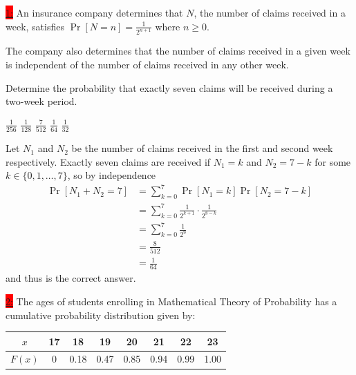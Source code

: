\documentclass{exam}
\begin{document}
\colorbox{red}{\underline{1:}} An insurance company determines that $N$, the number of claims received in a week, satisfies $\Pr[N = n] = \frac{1}{2^{n+1}}$ where $n \geq 0$.

The company also determines that the number of claims received in a given week is independent of the number of claims received in any other week.

Determine the probability that exactly seven claims will be received during a two-week period.

\begin{oneparchoices}
    \choice $\frac{1}{256}$
    \choice $\frac{1}{128}$
    \choice $\frac{7}{512}$
    \CorrectChoice $\frac{1}{64}$
    \choice $\frac{1}{32}$
\end{oneparchoices}
\begin{solution}
    Let $N_1$ and $N_2$ be the number of claims received in the first and second week respectively. Exactly seven claims are received if $N_1 = k$ and $N_2 = 7 - k$ for some $k \in \{0, 1, \dots, 7\}$, so by independence
    \begin{align*}
        \Pr[N_1 + N_2 = 7] &= \sum_{k=0}^{7} \Pr[N_1 = k]\Pr[N_2 = 7 - k] \\
        &= \sum_{k=0}^{7} \frac{1}{2^{k+1}} \cdot \frac{1}{2^{8-k}} \\
        &= \sum_{k=0}^{7} \frac{1}{2^{9}} \\
        &= \frac{8}{512} \\
        &= \boxed{\frac{1}{64}}
    \end{align*}
    and thus  is the correct answer.
\end{solution}

\colorbox{red}{\underline{2:}} The ages of students enrolling in Mathematical Theory of Probability has a cumulative probability distribution given by:

\begin{center}
\begin{tabular}{|c|c|c|c|c|c|c|c|}
\hline
$x$    & 17  & 18   & 19   & 20   & 21   & 22   & 23   \\ \hline
$F(x)$ & 0   & 0.18 & 0.47 & 0.85 & 0.94 & 0.99 & 1.00 \\ \hline
\end{tabular}
\end{center}
\end{document}
